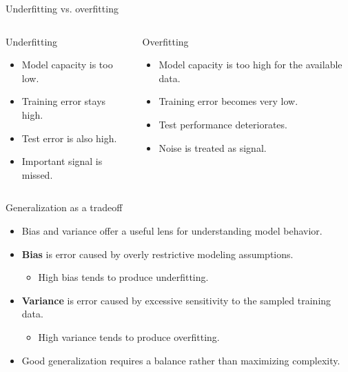 \documentclass[12pt]{beamer}
\begin{document}
\begin{frame}{Underfitting vs. overfitting}
  \begin{columns}[T]
      \begin{warningbox}{Underfitting}
        \begin{itemize}
          \item Model capacity is too low.
          \item Training error stays high.
          \item Test error is also high.
          \item Important signal is missed.
        \end{itemize}
      \end{warningbox}
      \begin{warningbox}{Overfitting}
        \begin{itemize}
          \item Model capacity is too high for the available data.
          \item Training error becomes very low.
          \item Test performance deteriorates.
          \item Noise is treated as signal.
        \end{itemize}
      \end{warningbox}
  \end{columns}
\end{frame}

\begin{frame}{Generalization as a tradeoff}
  \begin{itemize}
    \item Bias and variance offer a useful lens for understanding model behavior.
    \item \textbf{Bias} is error caused by overly restrictive modeling assumptions.
      \begin{itemize}
        \item High bias tends to produce underfitting.
      \end{itemize}
    \item \textbf{Variance} is error caused by excessive sensitivity to the sampled training data.
      \begin{itemize}
        \item High variance tends to produce overfitting.
      \end{itemize}
    \item Good generalization requires a balance rather than maximizing complexity.
  \end{itemize}
\end{frame}
\end{document}
